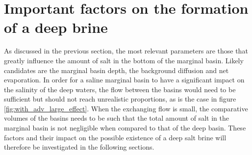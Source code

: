 \documentclass[twocolumn]{article}
\begin{document}
\FloatBarrier



\section{Important factors on the formation of a deep brine}
\label{sect:imprtant_parameters}
As discussed in the previous section, the most relevant parameters are those that greatly influence the amount of salt in the bottom of the marginal basin. Likely candidates are the marginal basin depth, the background diffusion and net evaporation. In order for a saline marginal basin to have a significant impact on the salinity of the deep waters, the flow between the basins would need to be sufficient but should not reach unrealistic proportions, as is the case in figure \ref{fig:with_adv_large_effect}. When the exchanging flow is small, the comparative volumes of the basins needs to be such that the total amount of salt in the marginal basin is not negligible when compared to that of the deep basin. These factors and their impact on the possible existence of a deep salt brine will therefore be investigated in the following sections.

\end{document}

